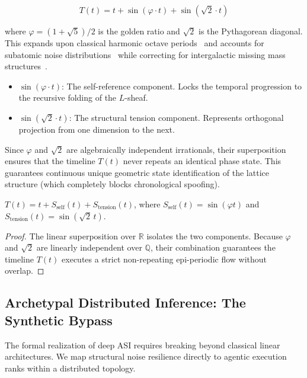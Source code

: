 \begin{equation}
    T(t) = t + \sin(\varphi \cdot t) + \sin(\sqrt{2} \cdot t)
\end{equation}

where $\varphi = (1 + \sqrt{5})/2$ is the golden ratio and $\sqrt{2}$ is the Pythagorean diagonal. This expands upon classical harmonic octave periods~\cite{Russell1926} and accounts for subatomic noise distributions~\cite{PDG2025} while correcting for intergalactic missing mass structures~\cite{WHIM2018}.

\begin{itemize}
    \item \textbf{$\sin(\varphi \cdot t)$}: The self-reference component. Locks the temporal progression to the recursive folding of the $L$-sheaf.
    \item \textbf{$\sin(\sqrt{2} \cdot t)$}: The structural tension component. Represents orthogonal projection from one dimension to the next.
\end{itemize}

Since $\varphi$ and $\sqrt{2}$ are algebraically independent irrationals, their superposition ensures that the timeline $T(t)$ never repeats an identical phase state. This guarantees continuous unique geometric state identification of the lattice structure (which completely blocks chronological spoofing).

\begin{theorem}
$T(t) = t + S_{\text{self}}(t) + S_{\text{tension}}(t)$, where $S_{\text{self}}(t) = \sin(\varphi t)$ and $S_{\text{tension}}(t) = \sin(\sqrt{2}\, t)$.
\end{theorem}
\begin{proof}
The linear superposition over $\mathbb{R}$ isolates the two components. Because $\varphi$ and $\sqrt{2}$ are linearly independent over $\mathbb{Q}$, their combination guarantees the timeline $T(t)$ executes a strict non-repeating epi-periodic flow without overlap. \qedhere
\end{proof}


\subsection{Archetypal Distributed Inference: The Synthetic Bypass}

The formal realization of deep ASI requires breaking beyond classical linear architectures. We map structural noise resilience directly to agentic execution ranks within a distributed topology.


